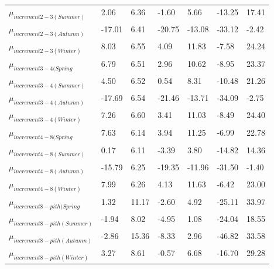 \documentclass{article}\usepackage[]{graphicx}\usepackage[]{color}
\begin{document}
\begin{table}[ht]
\begin{tabular}{|p{}|p{}|p{}|p{}|p{}|p{}|p{}|}
  $\mu_{increment 2-3 (Summer)}$ & 2.06 & 6.36 & -1.60 & 5.66 & -13.25 & 17.41 \\ 
  $\mu_{increment 2-3 (Autumn)}$ & -17.01 & 6.41 & -20.75 & -13.08 & -33.12 & -2.42 \\ 
  $\mu_{increment 2-3 (Winter)}$ & 8.03 & 6.55 & 4.09 & 11.83 & -7.58 & 24.24 \\ 
  $\mu_{increment 3-4 (Spring}$ & 6.79 & 6.51 & 2.96 & 10.62 & -8.95 & 23.37 \\ 
  $\mu_{increment 3-4 (Summer)}$ & 4.50 & 6.52 & 0.54 & 8.31 & -10.48 & 21.26 \\ 
  $\mu_{increment 3-4 (Autumn)}$ & -17.69 & 6.54 & -21.46 & -13.71 & -34.09 & -2.75 \\ 
  $\mu_{increment 3-4 (Winter)}$ & 7.26 & 6.60 & 3.41 & 11.03 & -8.49 & 24.40 \\ 
  $\mu_{increment 4-8 (Spring}$ & 7.63 & 6.14 & 3.94 & 11.25 & -6.99 & 22.78 \\ 
  $\mu_{increment 4-8 (Summer)}$ & 0.17 & 6.11 & -3.39 & 3.80 & -14.82 & 14.36 \\ 
  $\mu_{increment 4-8 (Autumn)}$ & -15.79 & 6.25 & -19.35 & -11.96 & -31.50 & -1.40 \\ 
  $\mu_{increment 4-8 (Winter)}$ & 7.99 & 6.26 & 4.13 & 11.63 & -6.42 & 23.00 \\ 
  $\mu_{increment 8-pith (Spring}$ & 1.32 & 11.17 & -2.60 & 4.92 & -25.11 & 33.97 \\ 
  $\mu_{increment 8-pith (Summer)}$ & -1.94 & 8.02 & -4.95 & 1.08 & -24.04 & 18.55 \\ 
  $\mu_{increment 8-pith (Autumn)}$ & -2.86 & 15.36 & -8.33 & 2.96 & -46.82 & 33.58 \\ 
  $\mu_{increment 8-pith (Winter)}$ & 3.27 & 8.61 & -0.57 & 6.68 & -16.70 & 29.28 \\ 
   \hline
\end{tabular}
\endgroup
\end{table}
\end{document}
